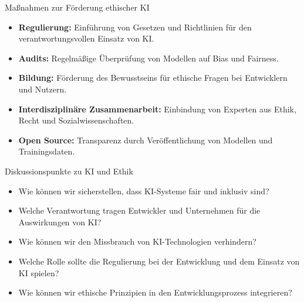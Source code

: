 \documentclass[aspectratio=1610, xcolor=dvipsnames, 9pt]{beamer}
\begin{document}
\begin{frame}{Maßnahmen zur Förderung ethischer KI}
  \begin{itemize}
    \item \textbf{Regulierung:} Einführung von Gesetzen und Richtlinien für den verantwortungsvollen Einsatz von KI. \\
    \item \textbf{Audits:} Regelmäßige Überprüfung von Modellen auf Bias und Fairness. \\
    \item \textbf{Bildung:} Förderung des Bewusstseins für ethische Fragen bei Entwicklern und Nutzern. \\
    \item \textbf{Interdisziplinäre Zusammenarbeit:} Einbindung von Experten aus Ethik, Recht und Sozialwissenschaften. \\
    \item \textbf{Open Source:} Transparenz durch Veröffentlichung von Modellen und Trainingsdaten. \\
  \end{itemize}
\end{frame}

\begin{frame}{Diskussionspunkte zu KI und Ethik}
  \begin{itemize}
    \item Wie können wir sicherstellen, dass KI-Systeme fair und inklusiv sind? \\
    \item Welche Verantwortung tragen Entwickler und Unternehmen für die Auswirkungen von KI? \\
    \item Wie können wir den Missbrauch von KI-Technologien verhindern? \\
    \item Welche Rolle sollte die Regulierung bei der Entwicklung und dem Einsatz von KI spielen? \\
    \item Wie können wir ethische Prinzipien in den Entwicklungsprozess integrieren?
  \end{itemize}
\end{frame}
\end{document}
